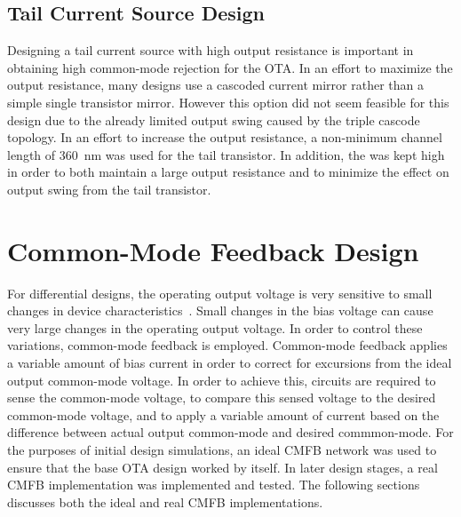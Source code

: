 \subsection{Tail Current Source Design}
Designing a tail current source with high output resistance is important in obtaining high common-mode rejection for the OTA. In an effort to maximize the output resistance, many designs use a cascoded current mirror rather than a simple single transistor mirror. However this option did not seem feasible for this design due to the already limited output swing caused by the triple cascode topology. In an effort to increase the output resistance, a non-minimum channel length of \SI{360}{\nano\meter} was used for the tail transistor. In addition, the \gmid\spc was kept high in order to both maintain a large output resistance and to minimize the effect on output swing from the tail transistor.
\section{Common-Mode Feedback Design}
\label{sec:otacmfb}
For differential designs, the operating output voltage is very sensitive to small changes in device characteristics~\cite{315areader}. Small changes in the bias voltage can cause very large changes in the operating output voltage. In order to control these variations, common-mode feedback is employed. Common-mode feedback applies a variable amount of bias current in order to correct for excursions from the ideal output common-mode voltage. In order to achieve this, circuits are required to sense the common-mode voltage, to compare this sensed voltage to the desired common-mode voltage, and to apply a variable amount of current based on the difference between actual output common-mode and desired commmon-mode. For the purposes of initial design simulations, an ideal CMFB network was used to ensure that the base OTA design worked by itself. In later design stages, a real CMFB implementation was implemented and tested. The following sections discusses both the ideal and real CMFB implementations.
